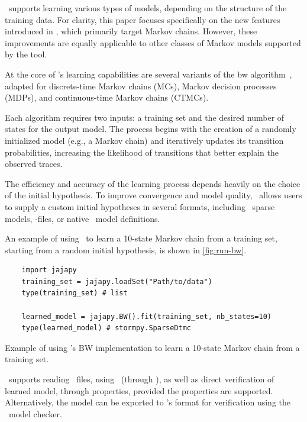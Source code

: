 \Jajapy\ supports learning various types of models, depending on the structure of the training data.
For clarity, this paper focuses specifically on the new features introduced in \JajapyTwo, which primarily target Markov chains.
However, these improvements are equally applicable to other classes of Markov models supported by the tool.

At the core of \Jajapy's learning capabilities are several variants of the \gls{bw} algorithm~\cite{Baum70,Rabiner89}, adapted for discrete-time Markov chains (MCs), Markov decision processes (MDPs)\cite{BacciILR21}, and continuous-time Markov chains (CTMCs)\cite{BacciILR23}.

Each algorithm requires two inputs: a training set and the desired number of states for the output model.
The process begins with the creation of a randomly initialized model (e.g., a Markov chain) and iteratively updates its transition probabilities, increasing the likelihood of transitions that better explain the observed traces.

The efficiency and accuracy of the learning process depends heavily on the choice of the initial hypothesis.
To improve convergence and model quality, \Jajapy\ allows users to supply a custom initial hypotheses in several formats, including \Stormpy~sparse models, \Prism-files, or native \Jajapy\ model definitions.

An example of using \Jajapy\ to learn a 10-state Markov chain from a training set, starting from a random initial hypothesis, is shown in \autoref{fig:run-bw}.


\begin{listing}
    \begin{verbatim} 
    import jajapy
    training_set = jajapy.loadSet("Path/to/data")
    type(training_set) # list 

    learned_model = jajapy.BW().fit(training_set, nb_states=10)
    type(learned_model) # stormpy.SparseDtmc 
    \end{verbatim}
    \caption{Example of using \Jajapy's BW implementation to learn a 10-state Markov chain from a training set.}
    \label{fig:run-bw}
\end{listing}


\Jajapy\ supports reading \Prism\ files, using \Storm\ (through \Stormpy), as well as direct verification of learned model, through properties, provided the properties are supported.
Alternatively, the model can be exported to \Prism's format for verification using the \Prism\ model checker.



